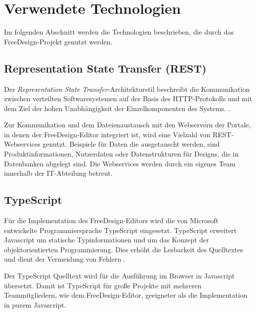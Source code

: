 

\section{Verwendete Technologien}
Im folgenden Abschnitt werden die Technologien beschrieben, die durch das FreeDesign-Projekt genutzt werden. 

\subsection{Representation State Transfer (REST)}
Der \emph{Representation State Transfer}-Architekturstil beschreibt die Kommunikation zwischen verteilten Softwaresystemen auf der Basis des HTTP-Protokolls und mit dem Ziel der hohen Unabhängigkeit der Einzelkomponenten des Systems. \autocite[vgl.][105-106]{Fielding2000}.

Zur Kommunikation und dem Dateienaustausch mit den Webservern der Portale, in denen der FreeDesign-Editor integriert ist, wird eine Vielzahl von REST-Webservices genutzt. 
Beispiele für Daten die ausgetauscht werden, sind Produktinformationen, Nutzerdaten oder Datenstrukturen für Designs, die in Datenbanken abgelegt sind.
Die Webservices werden durch ein eigenes Team innerhalb der IT-Abteilung betreut.  

\subsection{TypeScript}
Für die Implementation des FreeDesign-Editors wird die von Microsoft entwickelte Programmiersprache TypeScript eingesetzt. TypeScript erweitert Javascript um statische Typinformationen und um das Konzept der objektorientierten Programmierung. Dies erhöht die Lesbarkeit des Quelltextes und dient der Vermeidung von Fehlern \autocite[vgl.][S. 111]{Zeigermann2014}. 

Der TypeScript Quelltext wird für die Ausführung im Browser in Javascript übersetzt. Damit ist TypeScript für große Projekte mit mehreren Teammitgliedern, wie dem FreeDesign-Editor, geeigneter als die Implementation in purem Javascript.

